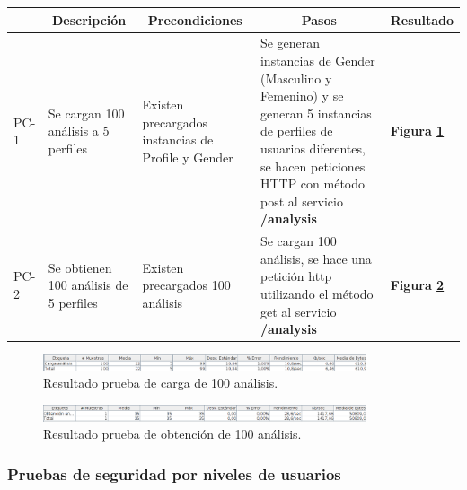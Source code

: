 \newpage

\begin{longtable}{|p{1.0cm}|p{3cm}|p{3cm}|p{3.5cm}|p{2.5cm}|}
	\hline \hline
		\rowcolor[gray]{0.9} 
		\multicolumn{1}{|c}{ID} & \multicolumn{1}{|c|}{Descripción} & \multicolumn{1}{c|}{Precondiciones} & \multicolumn{1}{c|}{Pasos} &
		\multicolumn{1}{c|}{Resultado} \\
	\hline
	PC-1 & Se cargan 100 análisis a 5 perfiles  & Existen precargados instancias de Profile y Gender & Se generan instancias de Gender (Masculino y Femenino) y se generan 5 instancias de perfiles de usuarios diferentes, se hacen peticiones HTTP con método post al servicio \textbf{/analysis} & \textbf{Figura \ref{pc_a_1}} \\
	\hline
	PC-2 & Se obtienen 100 análisis de 5 perfiles & Existen precargados 100 análisis & Se cargan 100 análisis, se hace una petición http utilizando el método get al servicio \textbf{/analysis} & \textbf{Figura \ref{pc_a_2}}\\
		\hline

\end{longtable}

\begin{figure}[h]
    \centering
    \includegraphics[width=0.85\textwidth]{img/PC_analisis_1}
    \caption{Resultado prueba de carga de 100 análisis.}
	\label{pc_a_1}
\end{figure}

\begin{figure}[h]
    \centering
    \includegraphics[width=0.85\textwidth]{img/PC_analisis_2}
    \caption{Resultado prueba de obtención de 100 análisis.}
	\label{pc_a_2}
\end{figure}
\clearpage
\subsubsection{Pruebas de seguridad por niveles de usuarios}

